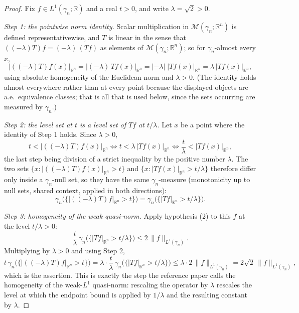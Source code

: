 \begin{proof}
Fix $f \in L^1(\gamma_n;\mathbb{R})$ and a real $t > 0$, and write
$\lambda = \sqrt2 > 0$.

\emph{Step 1: the pointwise norm identity.}
Scalar multiplication in $\mathcal{M}(\gamma_n;\mathbb{R}^n)$ is defined
representativewise, and $T$ is linear in the sense that
$((-\lambda)T)f = (-\lambda)\,(Tf)$ as elements of
$\mathcal{M}(\gamma_n;\mathbb{R}^n)$; so for $\gamma_n$-almost every $x$,
\[
  |((-\lambda)T)f(x)|_{\mathbb{R}^n} = |(-\lambda)\,Tf(x)|_{\mathbb{R}^n}
    = |-\lambda|\;|Tf(x)|_{\mathbb{R}^n} = \lambda\,|Tf(x)|_{\mathbb{R}^n},
\]
using absolute homogeneity of the Euclidean norm and $\lambda > 0$.  (The
identity holds almost everywhere rather than at every point because the
displayed objects are a.e.\ equivalence classes; that is all that is used below,
since the sets occurring are measured by $\gamma_n$.)

\emph{Step 2: the level set at $t$ is a level set of $T f$ at $t/\lambda$.}
Let $x$ be a point where the identity of Step 1 holds.  Since $\lambda > 0$,
\[
  t < |((-\lambda)T)f(x)|_{\mathbb{R}^n}
  \iff t < \lambda\,|Tf(x)|_{\mathbb{R}^n}
  \iff \frac{t}{\lambda} < |Tf(x)|_{\mathbb{R}^n},
\]
the last step being division of a strict inequality by the positive number
$\lambda$.  The two sets
$\{x : |((-\lambda)T)f(x)|_{\mathbb{R}^n} > t\}$ and
$\{x : |Tf(x)|_{\mathbb{R}^n} > t/\lambda\}$ therefore differ only inside a
$\gamma_n$-null set, so they have the same $\gamma_n$-measure (monotonicity up to
null sets, shared context, applied in both directions):
\[
  \gamma_n\bigl(\{|((-\lambda)T)f|_{\mathbb{R}^n} > t\}\bigr)
    = \gamma_n\bigl(\{|Tf|_{\mathbb{R}^n} > t/\lambda\}\bigr).
\]

\emph{Step 3: homogeneity of the weak quasi-norm.}
Apply hypothesis (2) to this $f$ at the level $t/\lambda > 0$:
\[
  \frac{t}{\lambda}\,\gamma_n\bigl(\{|Tf|_{\mathbb{R}^n} > t/\lambda\}\bigr)
    \leq 2\,\|f\|_{L^1(\gamma_n)} .
\]
Multiplying by $\lambda > 0$ and using Step 2,
\[
  t\,\gamma_n\bigl(\{|((-\lambda)T)f|_{\mathbb{R}^n} > t\}\bigr)
    = \lambda \cdot \frac{t}{\lambda}\,
      \gamma_n\bigl(\{|Tf|_{\mathbb{R}^n} > t/\lambda\}\bigr)
    \leq \lambda \cdot 2\,\|f\|_{L^1(\gamma_n)}
    = 2\sqrt2\,\|f\|_{L^1(\gamma_n)} ,
\]
which is the assertion.  This is exactly the step the reference paper calls the
homogeneity of the weak-$L^1$ quasi-norm: rescaling the operator by $\lambda$
rescales the level at which the endpoint bound is applied by $1/\lambda$ and the
resulting constant by $\lambda$.
\end{proof}
